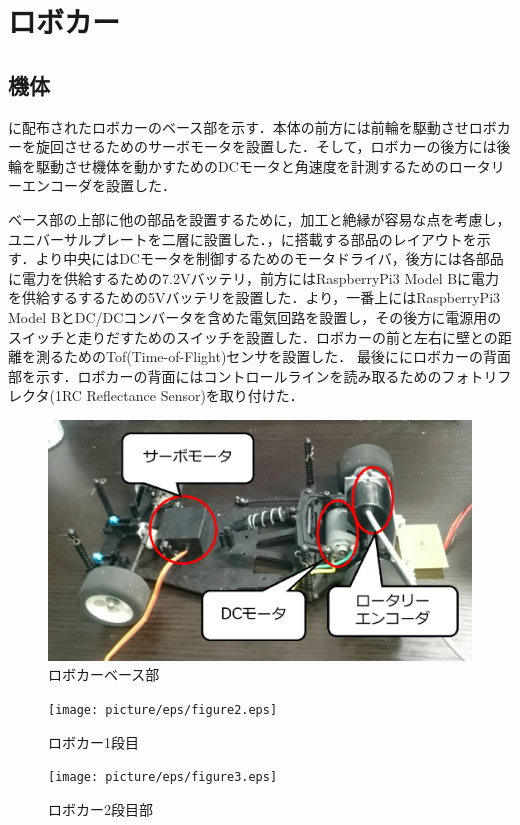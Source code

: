 \section{ロボカー}
\subsection{機体}
に配布されたロボカーのベース部を示す．本体の前方には前輪を駆動させロボカーを旋回させるためのサーボモータを設置した．そして，ロボカーの後方には後輪を駆動させ機体を動かすためのDCモータと角速度を計測するためのロータリーエンコーダを設置した．

ベース部の上部に他の部品を設置するために，加工と絶縁が容易な点を考慮し，ユニバーサルプレートを二層に設置した．，に搭載する部品のレイアウトを示す．より中央にはDCモータを制御するためのモータドライバ，後方には各部品に電力を供給するための7.2Vバッテリ，前方にはRaspberryPi3 Model Bに電力を供給するするための5Vバッテリを設置した．より，一番上にはRaspberryPi3 Model BとDC/DCコンバータを含めた電気回路を設置し，その後方に電源用のスイッチと走りだすためのスイッチを設置した．ロボカーの前と左右に壁との距離を測るためのTof(Time-of-Flight)センサを設置した．
最後ににロボカーの背面部を示す．ロボカーの背面にはコントロールラインを読み取るためのフォトリフレクタ(1RC Reflectance Sensor)を取り付けた．

\begin{figure}[htb]
 \centering
  \includegraphics[width=0.5\hsize]{picture/eps/figure1.eps}
  \caption{ロボカーベース部}
  \label{fig::figure1}
\end{figure}

\begin{figure}[htb]
 \centering
  \texttt{[image: picture/eps/figure2.eps]}
  \caption{ロボカー1段目}
  \label{fig::figure2}
\end{figure}

\begin{figure}[htb]
 \centering
  \texttt{[image: picture/eps/figure3.eps]}
  \caption{ロボカー2段目部}
  \label{fig::figure3}
\end{figure}

